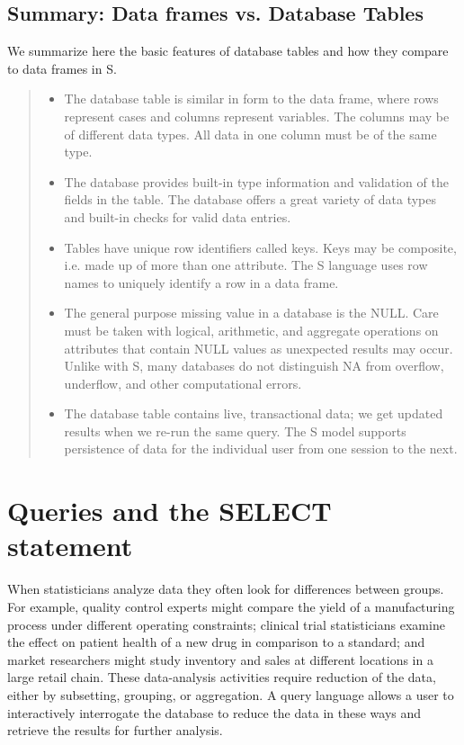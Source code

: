 \subsection{Summary: Data frames vs. Database Tables}

We summarize here the basic features of database tables and how they
compare to data frames in S.

\begin{quote}
\begin{itemize}
\item The database table is similar in form to the data frame, where
rows represent cases and columns represent variables. The columns
may be of different data types.
All data in one column must be of the same type.

\item The database provides built-in type information and validation of
the fields in the table. 
The database offers a great variety of data types and built-in checks
for valid data entries.

\item Tables have unique row identifiers called keys. Keys may be
composite, i.e. made up of more than one attribute.  The S language
uses row names to uniquely identify a row in a data frame.

\item The general purpose missing value in a database is the NULL.  Care
must be taken with logical, arithmetic, and aggregate operations on attributes
that contain NULL values as unexpected results may occur. 
Unlike with S, many databases do not distinguish NA from overflow, underflow, 
and other computational errors.  

\item The database table contains live, transactional data; we get updated 
results when we re-run the same query. 
The S model supports persistence of data for the individual user 
from one session to the next.
\end{itemize}
\end{quote}


\section{Queries and the SELECT statement}\label{dbms:sect:SELECT}

When statisticians analyze data they often look for differences 
between groups.
For example, quality control experts might compare the yield of a 
manufacturing process under different operating constraints;
clinical trial statisticians examine the effect on patient health
of a new drug in comparison to a standard; 
and market researchers might study inventory and sales at different 
locations in a large retail chain. 
These data-analysis activities require reduction of the data, 
either by subsetting, grouping, or aggregation. 
A query language allows a user to interactively interrogate the 
database to reduce the data in these ways and retrieve the
results for further analysis. 

